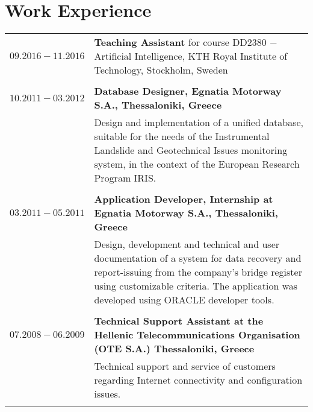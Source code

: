 \documentclass[a4paper,10pt,twoside]{article}
\begin{document}

\section{Work Experience}


\begin{tabular}{rp{11cm}}
$09.2016 - 11.2016$ & \textbf{Teaching Assistant} for course DD2380 $-$ Artificial Intelligence, KTH Royal Institute of Technology, Stockholm, Sweden\\
&\\

$10.2011 - 03.2012$ & \textbf{Database Designer, Egnatia Motorway S.A., Thessaloniki, Greece} \\
& \small{Design and implementation of a unified database, suitable for the needs of the
Instrumental Landslide and Geotechnical Issues
monitoring system, in the context of the European Research Program IRIS.
}\\
\multicolumn{2}{c}{} \\


$03.2011 - 05.2011$ & \textbf{Application Developer, Internship at Egnatia Motorway S.A., Thessaloniki, Greece}\\
& \small{Design, development and technical and user documentation of a system for data
recovery and report-issuing from the company's bridge register using
customizable criteria. The application was developed using ORACLE developer tools.
}\\
\multicolumn{2}{c}{} \\


$07.2008 - 06.2009$ & \textbf{Technical Support Assistant at the Hellenic Telecommunications
Organisation (OTE S.A.) Thessaloniki, Greece}\\
& \small{Technical support and service of customers regarding Internet connectivity and configuration
issues.}\\
&\\
\end{tabular}


\end{document}
